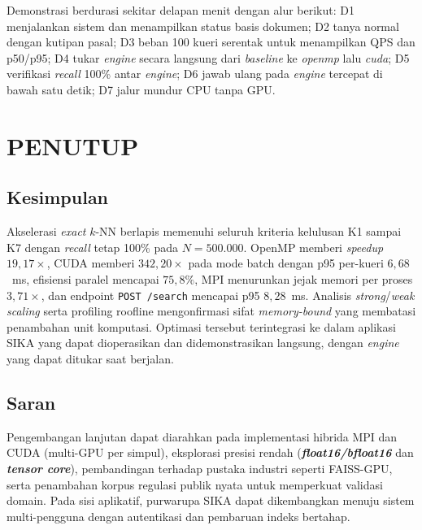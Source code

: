 \documentclass[12pt,a4paper,oneside]{report}
\newcommand{\keyword}[1]{\textbf{\textit{#1}}}
\begin{document}
Demonstrasi berdurasi sekitar delapan menit dengan alur berikut: D1 menjalankan sistem dan menampilkan status basis dokumen; D2 tanya normal dengan kutipan pasal; D3 beban 100 kueri serentak untuk menampilkan QPS dan p50/p95; D4 tukar \textit{engine} secara langsung dari \textit{baseline} ke \textit{openmp} lalu \textit{cuda}; D5 verifikasi \textit{recall} 100\% antar \textit{engine}; D6 jawab ulang pada \textit{engine} tercepat di bawah satu detik; D7 jalur mundur CPU tanpa GPU.

\chapter{PENUTUP}

\section{Kesimpulan}

Akselerasi \textit{exact} $k$-NN berlapis memenuhi seluruh kriteria kelulusan K1 sampai K7 dengan \textit{recall} tetap 100\% pada $N=500.000$. OpenMP memberi \textit{speedup} $19{,}17\times$, CUDA memberi $342{,}20\times$ pada mode batch dengan p95 per-kueri $6{,}68$~ms, efisiensi paralel mencapai $75{,}8\%$, MPI menurunkan jejak memori per proses $3{,}71\times$, dan endpoint \texttt{POST /search} mencapai p95 $8{,}28$~ms. Analisis \textit{strong}/\textit{weak scaling} serta profiling roofline mengonfirmasi sifat \textit{memory-bound} yang membatasi penambahan unit komputasi. Optimasi tersebut terintegrasi ke dalam aplikasi SIKA yang dapat dioperasikan dan didemonstrasikan langsung, dengan \textit{engine} yang dapat ditukar saat berjalan.

\section{Saran}

Pengembangan lanjutan dapat diarahkan pada implementasi hibrida MPI dan CUDA (multi-GPU per simpul), eksplorasi presisi rendah (\keyword{float16/bfloat16} dan \keyword{tensor core}), pembandingan terhadap pustaka industri seperti FAISS-GPU, serta penambahan korpus regulasi publik nyata untuk memperkuat validasi domain. Pada sisi aplikatif, purwarupa SIKA dapat dikembangkan menuju sistem multi-pengguna dengan autentikasi dan pembaruan indeks bertahap.
\end{document}

